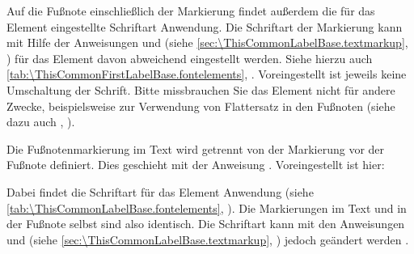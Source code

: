 \BeginIndexGroup
{}%
%
Auf%
 die Fußnote einschließlich der Markierung findet außerdem die für das
Element  eingestellte
Schriftart Anwendung. Die %
Schriftart der Markierung kann %
%
mit Hilfe der Anweisungen  und
 (siehe
\autoref{sec:\ThisCommonLabelBase.textmarkup},
) für das Element
 davon
abweichend eingestellt werden. Siehe hierzu auch
\autoref{tab:\ThisCommonFirstLabelBase.fontelements},
.  Voreingestellt ist
jeweils keine Umschaltung der Schrift.%
 Bitte missbrauchen Sie das Element nicht für andere
Zwecke, beispielsweise zur Verwendung von Flattersatz in den Fußnoten (siehe
dazu auch ,
).

%
%
Die Fußnotenmarkierung im Text wird getrennt von der Markierung vor der
Fußnote definiert. Dies geschieht mit der Anweisung
. Voreingestellt ist hier:
\begin{lstcode}
\end{lstcode}
Dabei findet%
 die Schriftart für das Element
%
 Anwendung (siehe %
\autoref{tab:\ThisCommonLabelBase.fontelements},
). Die Markierungen im Text
und in der Fußnote selbst sind also identisch. Die Schriftart kann mit den
Anweisungen  und
 (siehe
\autoref{sec:\ThisCommonLabelBase.textmarkup},
) jedoch geändert werden%
.

